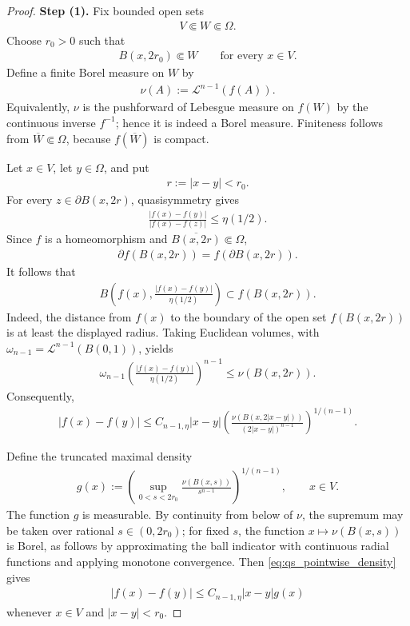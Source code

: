 \documentclass[10pt,a4paper]{amsart}
\begin{document}
\begin{proof}
\textbf{Step (1).} 
Fix bounded open sets
\begin{align}
V\Subset W\Subset\Omega.\nonumber
\end{align}
Choose \(r_0>0\) such that
\begin{align}
B(x,2r_0)\Subset W
\qquad
\text{for every }x\in V.\nonumber
\end{align}
Define a finite Borel measure on \(W\) by
\begin{align}
\nu(A):=\mathcal L^{n-1}(f(A)).\nonumber
\end{align}
Equivalently, \(\nu\) is the pushforward of Lebesgue measure on
\(f(W)\) by the continuous inverse \(f^{-1}\); hence it is indeed a
Borel measure.  Finiteness follows from \(\overline W\Subset\Omega\),
because \(f(\overline W)\) is compact.

Let \(x\in V\), let \(y\in\Omega\), and put
\begin{align}
r:=|x-y|<r_0.\nonumber
\end{align}
For every \(z\in\partial B(x,2r)\), quasisymmetry gives
\begin{align}
\frac{|f(x)-f(y)|}{|f(x)-f(z)|}
\leq
\eta(1/2).\nonumber
\end{align}
Since \(f\) is a homeomorphism and \(\overline{B(x,2r)}\Subset\Omega\),
\begin{align}
\partial f(B(x,2r))=f(\partial B(x,2r)).\nonumber
\end{align}
It follows that
\begin{align}
B\!\left(
 f(x),\frac{|f(x)-f(y)|}{\eta(1/2)}
\right)
\subset f(B(x,2r)).\nonumber
\end{align}
Indeed, the distance from \(f(x)\) to the boundary of the open set
\(f(B(x,2r))\) is at least the displayed radius.  Taking Euclidean
volumes, with \(\omega_{n-1}=\mathcal L^{n-1}(B(0,1))\), yields
\begin{align}
\omega_{n-1}
\left(
\frac{|f(x)-f(y)|}{\eta(1/2)}
\right)^{n-1}
\leq
\nu(B(x,2r)).\nonumber
\end{align}
Consequently,
\begin{align}
|f(x)-f(y)|
\leq
C_{n-1,\eta}|x-y|
\left(
\frac{\nu(B(x,2|x-y|))}{(2|x-y|)^{n-1}}
\right)^{1/(n-1)}.
\label{eq:qs_pointwise_density}
\end{align}

Define the truncated maximal density
\begin{align}
g(x)
:=
\left(
\sup_{0<s<2r_0}
\frac{\nu(B(x,s))}{s^{n-1}}
\right)^{1/(n-1)},
\qquad x\in V.
\label{eq:g_def}
\end{align}
The function \(g\) is measurable.  By continuity from below of \(\nu\),
the supremum may be taken over rational \(s\in(0,2r_0)\); for fixed
\(s\), the function \(x\mapsto\nu(B(x,s))\) is Borel, as follows by
approximating the ball indicator with continuous radial functions and
applying monotone convergence.
Then \eqref{eq:qs_pointwise_density} gives
\begin{align}
|f(x)-f(y)|
\leq
C_{n-1,\eta}|x-y|g(x)
\label{eq:hajlasz_one_point}
\end{align}
whenever \(x\in V\) and \(|x-y|<r_0\).


\end{proof}
\end{document}
